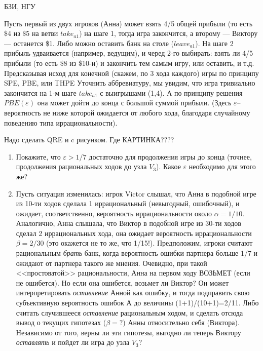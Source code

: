 \begin{problem}
\begin{source}
БЗИ, НГУ
\end{source}
Пусть первый из двух игроков (Анна) может взять 4/5 общей
прибыли (то есть \$4 из \$5 на ветви $take_{a1}$) на шаге
1, тогда игра закончится, а второму --- Виктору --- останется
\$1. Либо можно оставить банк на столе ($leave_{a1}$). На
шаге 2 прибыль удваивается (например, ведущим), и черед
2-го выбирать: взять ли 4/5 прибыли (то есть \$8 из \$10-и)
и закончить тем самым игру, или оставить, и т.д.
Предсказывая исход для конечной (скажем, по 3 хода каждого)
игры по принципу SPE, PBE, или THPE {\red Уточнить аббревиатуру}, мы увидим, что игра
тривиально закончится на 1-м шаге $take_{a1}$ с выигрышами
(1,4). А по принципу решения $PBE(\varepsilon)$ она может
дойти до конца с большой суммой прибыли. (Здесь
$\varepsilon$-- вероятность не ниже которой ожидается от
любого хода, благодаря случайному поведению типа
иррациональности).

{\red Надо сделать QRE и c рисунком. Где КАРТИНКА????}

\begin{enumerate}
\item Покажите, что $\varepsilon >1/7$ достаточно для продолжения
игры до конца (точнее, продолжения рациональных ходов до
узла $V_3$). Какое $\varepsilon$ необходимо для этого же?

\item Пусть ситуация изменилась: игрок Victor слышал, что Анна
в подобной игре из 10-ти ходов сделала 1 иррациональный
(невыгодный, ошибочный), и ожидает, соответственно,
вероятность иррациональности около $\alpha= 1/10$.
Аналогично,  Анна слышала, что Виктор в подобной игре из
30-ти ходов сделал 2 иррациональных хода, она ожидает
вероятность иррациональности $\beta= 2/30$ (это окажется не
то же, что 1/15!). Предположим, игроки считают рациональным
{\em брать} банк, когда вероятность ошибки партнера больше
1/7 и ожидают от партнера такого же мнения. Очевидно, при
такой <<простоватой>> рациональности, Анна на первом ходу
ВОЗЬМЕТ (если не ошибется). Но если она ошибется, возьмет ли
Виктор? Он может интерпретировать {\em оставление} Анной
как ошибку, и тогда подправить свою субъективную
вероятность ошибок А до величины (1+1)/(10+1)=2/11. Либо
считать случившееся {\em оставление} рациональным ходом, и
сделать отсюда вывод о текущих гипотезах ($\beta=?$) Анны
относительно себя (Виктора). Независимо от того, верны ли
эти гипотезы, выгодно ли теперь Виктору {\em оставлять} и
пойдет ли игра до узла $V_3$?


\end{enumerate}
\end{problem}
